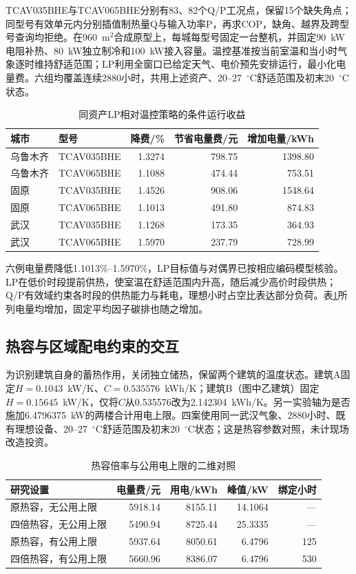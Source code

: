 TCAV035BHE与TCAV065BHE分别有83、82个Q/P工况点，保留15个缺失角点；同型号有效单元内分别插值制热量Q与输入功率P，再求COP，缺角、越界及跨型号查询均拒绝。在960~m$^2$合成原型上，每城每型号固定一台整机，并固定90~kW电阻补热、80~kW独立制冷和100~kW接入容量。温控基准按当前室温和当小时气象逐时维持舒适范围；LP利用全窗口已给定天气、电价预先安排运行，最小化电量费。六组均覆盖连续2880小时，共用上述资产、20--27~$^\circ$C舒适范围及初末20~$^\circ$C状态。

\begin{table}[htbp]
\centering
\caption{同资产LP相对温控策略的条件运行收益}\label{tab:heatpump}
\begin{tabularx}{\textwidth}{@{}lXrrr@{}}
\toprule
城市 & 型号 & 降费/\% & 节省电量费/元 & 增加电量/kWh\\
\midrule
乌鲁木齐 & TCAV035BHE & 1.3274 & 798.75 & 1398.80\\
乌鲁木齐 & TCAV065BHE & 1.1088 & 474.44 & 753.51\\
固原 & TCAV035BHE & 1.4526 & 908.06 & 1548.64\\
固原 & TCAV065BHE & 1.1013 & 491.80 & 874.83\\
武汉 & TCAV035BHE & 1.1268 & 173.35 & 364.93\\
武汉 & TCAV065BHE & 1.5970 & 237.79 & 728.99\\
\bottomrule
\end{tabularx}
\end{table}

六例电量费降低1.1013\%--1.5970\%，LP目标值与对偶界已按相应编码模型核验。LP在低价时段提前供热，使室温在舒适范围内升高，随后减少高价时段供热；Q/P有效域约束各时段的供热能力与耗电，理想小时占空比表达部分负荷。表\ref{tab:heatpump}所列电量均增加，固定平均因子碳排也随之增加。

\subsection{热容与区域配电约束的交互}

为识别建筑自身的蓄热作用，关闭独立储热，保留两个建筑的温度状态。建筑A固定$H=0.1043$~kW/K、$C=0.535576$~kWh/K；建筑B（图中乙建筑）固定$H=0.15645$~kW/K，仅将$C$从0.535576改为2.142304~kWh/K。另一实验轴为是否施加6.4796375~kW的两楼合计用电上限。四案使用同一武汉气象、2880小时、既有理想设备、20--27~$^\circ$C舒适范围及初末20~$^\circ$C状态；这是热容参数对照，未计现场改造投资。

\begin{table}[htbp]
\centering
\caption{热容倍率与公用电上限的二维对照}\label{tab:factorial}
\begin{tabularx}{\textwidth}{@{}Xrrrr@{}}
\toprule
研究设置 & 电量费/元 & 用电/kWh & 峰值/kW & 绑定小时\\
\midrule
原热容，无公用上限 & 5918.14 & 8155.11 & 14.1064 & ---\\
四倍热容，无公用上限 & 5490.94 & 8725.44 & 25.3335 & ---\\
原热容，有公用上限 & 5937.64 & 8050.61 & 6.4796 & 125\\
四倍热容，有公用上限 & 5660.96 & 8386.07 & 6.4796 & 530\\
\bottomrule
\end{tabularx}
\end{table}

